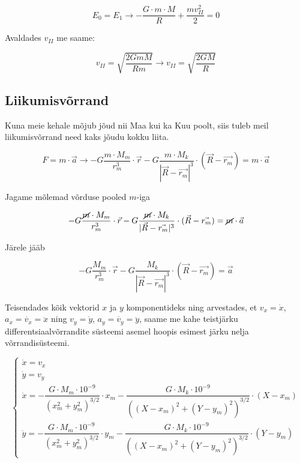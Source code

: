 \begin{flushleft}
\begin{equation}
\label{eq3_16}
E_{0} = E_{1} \longrightarrow - \dfrac{G\cdot m \cdot M}{R} + \dfrac{mv_{II}^{2}}{2} = 0
\end{equation}

Avaldades $v_{II}$ me saame:

\begin{equation}
\label{eq3_17}
v_{II}=\sqrt{\dfrac{2GmM}{Rm}} \longrightarrow v_{II}=\sqrt{\dfrac{2GM}{R}}
\end{equation}

\vspace{5mm}
\subsection{Liikumisvõrrand}

\vspace{5mm}
Kuna meie kehale mõjub jõud nii Maa kui ka Kuu poolt, siis tuleb meil liikumisvõrrand need kaks jõudu kokku liita.

\begin{equation}
\label{eq3_18}
F= m \cdot \vec{a} \longrightarrow -G\dfrac{m \cdot M_{m}}{r_{m}^{3}}\cdot \vec{r} - G \dfrac{m \cdot M_{k}}{|\vec{R}-\vec{r_{m}}|^{3}}\cdot(\vec{R}-\vec{r_{m}}) = m\cdot \vec{a}
\end{equation}

Jagame mõlemad võrduse pooled $m$-iga

\begin{equation}
\label{eq3_19}
-G\dfrac{\cancel{m} \cdot M_{m}}{r_{m}^{3}}\cdot \vec{r} - G \dfrac{\cancel{m} \cdot M_{k}}{|\vec{R}-\vec{r_{m}}|^{3}}\cdot(\vec{R}-\vec{r_{m}}) = \cancel{m}\cdot \vec{a}
\end{equation}

Järele jääb

\begin{equation}
\label{eq3_20}
-G\dfrac{ M_{m}}{r_{m}^{3}}\cdot \vec{r} - G \dfrac{ M_{k}}{|\vec{R}-\vec{r_{m}}|^{3}}\cdot(\vec{R}-\vec{r_{m}}) = \vec{a}
\end{equation}

Teisendades kõik vektorid $x$ ja $y$ komponentideks ning arvestades, et $v_{x}=\dot{x}$, $a_{x}=\dot{v_{x}}=\ddot{x}$ ning $v_{y}=\dot{y}$, $a_{y}=\dot{v_{y}}=\ddot{y}$, saame me kahe teistjärku differentsiaalvõrrandite süsteemi asemel hoopis esimest järku nelja võrrandisüsteemi.

\begin{equation}
\label{eq3_21}
\begin{cases}
\dot{x}=v_{x}\\
\dot{y} = v_{y}\\
\ddot{x} = - \dfrac{G \cdot M_{m} \cdot 10^{-9}}{(x_{m}^{2}+y_{m}^{2})^{3/2}}\cdot x_{m} - \dfrac{G \cdot M_{k} \cdot 10^{-9}}{((X-x_{m})^{2}+(Y-y_{m})^{2})^{3/2}}\cdot (X-x_{m}) \\
\ddot{y} = - \dfrac{G \cdot M_{m} \cdot 10^{-9}}{(x_{m}^{2}+y_{m}^{2})^{3/2}}\cdot y_{m} - \dfrac{G \cdot M_{k} \cdot 10^{-9}}{((X-x_{m})^{2}+(Y-y_{m})^{2})^{3/2}} \cdot (Y-y_{m})


\end{cases}
\end{equation}
\end{flushleft}
